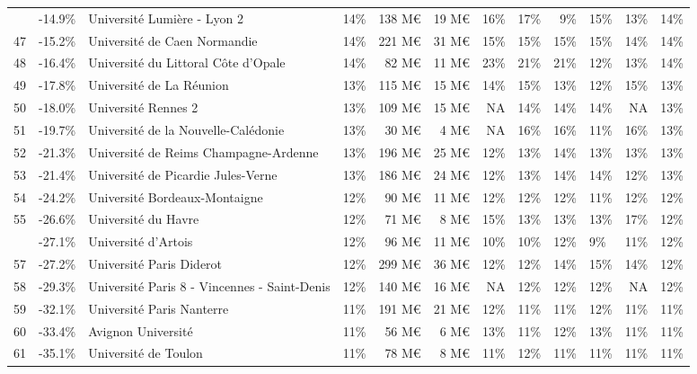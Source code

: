 \documentclass[12pt,french,landscape]{article}
\begin{document}
\begin{longtable}{rrlrrrrrrlrr}
\addlinespace
46 & -14.9\% & Université Lumière - Lyon 2 & 14\% & 138 M€ & 19 M€ & 16\% & 17\% & 9\% & 15\% & 13\% & 14\%\\
\rowcolor{gray!6}  47 & -15.2\% & Université de Caen Normandie & 14\% & 221 M€ & 31 M€ & 15\% & 15\% & 15\% & 15\% & 14\% & 14\%\\
48 & -16.4\% & Université du Littoral Côte d'Opale & 14\% & 82 M€ & 11 M€ & 23\% & 21\% & 21\% & 12\% & 13\% & 14\%\\
\rowcolor{gray!6}  49 & -17.8\% & Université de La Réunion & 13\% & 115 M€ & 15 M€ & 14\% & 15\% & 13\% & 12\% & 15\% & 13\%\\
50 & -18.0\% & Université Rennes 2 & 13\% & 109 M€ & 15 M€ & NA & 14\% & 14\% & 14\% & NA & 13\%\\
\addlinespace
\rowcolor{gray!6}  51 & -19.7\% & Université de la Nouvelle-Calédonie & 13\% & 30 M€ & 4 M€ & NA & 16\% & 16\% & 11\% & 16\% & 13\%\\
52 & -21.3\% & Université de Reims Champagne-Ardenne & 13\% & 196 M€ & 25 M€ & 12\% & 13\% & 14\% & 13\% & 13\% & 13\%\\
\rowcolor{gray!6}  53 & -21.4\% & Université de Picardie Jules-Verne & 13\% & 186 M€ & 24 M€ & 12\% & 13\% & 14\% & 14\% & 12\% & 13\%\\
54 & -24.2\% & Université Bordeaux-Montaigne & 12\% & 90 M€ & 11 M€ & 12\% & 12\% & 12\% & 11\% & 12\% & 12\%\\
\rowcolor{gray!6}  55 & -26.6\% & Université du Havre & 12\% & 71 M€ & 8 M€ & 15\% & 13\% & 13\% & 13\% & 17\% & 12\%\\
\addlinespace
56 & -27.1\% & Université d'Artois & 12\% & 96 M€ & 11 M€ & 10\% & 10\% & 12\% & 9\% & 11\% & 12\%\\
\rowcolor{gray!6}  57 & -27.2\% & Université Paris Diderot & 12\% & 299 M€ & 36 M€ & 12\% & 12\% & 14\% & 15\% & 14\% & 12\%\\
58 & -29.3\% & Université Paris 8 - Vincennes - Saint-Denis & 12\% & 140 M€ & 16 M€ & NA & 12\% & 12\% & 12\% & NA & 12\%\\
\rowcolor{gray!6}  59 & -32.1\% & Université Paris Nanterre & 11\% & 191 M€ & 21 M€ & 12\% & 11\% & 11\% & 12\% & 11\% & 11\%\\
60 & -33.4\% & Avignon Université & 11\% & 56 M€ & 6 M€ & 13\% & 11\% & 12\% & 13\% & 11\% & 11\%\\
\addlinespace
\rowcolor{gray!6}  61 & -35.1\% & Université de Toulon & 11\% & 78 M€ & 8 M€ & 11\% & 12\% & 11\% & 11\% & 11\% & 11\%\\

\end{longtable}
\end{document}
